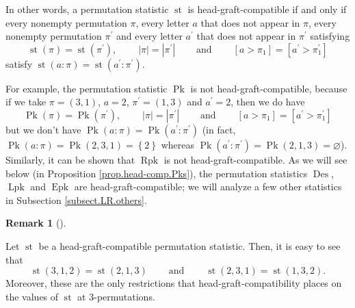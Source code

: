 \documentclass[numbers=enddot,12pt,final,onecolumn,notitlepage]{scrartcl}%
\theoremstyle{definition}
\newtheorem{remk}[theo]{Remark}
\newenvironment{remark}[1][]
{\begin{remk}[#1]\begin{leftbar}}
{\end{leftbar}\end{remk}}
\begin{document}
In other words, a permutation statistic $\operatorname*{st}$ is
head-graft-compatible if and only if every nonempty permutation $\pi$, every
letter $a$ that does not appear in $\pi$, every nonempty permutation
$\pi^{\prime}$ and every letter $a^{\prime}$ that does not appear in
$\pi^{\prime}$ satisfying%
\[
\operatorname*{st}\left(  \pi\right)  =\operatorname*{st}\left(  \pi^{\prime
}\right)  ,\ \ \ \ \ \ \ \ \ \ \left\vert \pi\right\vert =\left\vert
\pi^{\prime}\right\vert \ \ \ \ \ \ \ \ \ \ \text{and}%
\ \ \ \ \ \ \ \ \ \ \left[  a>\pi_{1}\right]  =\left[  a^{\prime}>\pi
_{1}^{\prime}\right]
\]
satisfy $\operatorname*{st}\left(  a:\pi\right)  =\operatorname*{st}\left(
a^{\prime}:\pi^{\prime}\right)  $.

For example, the permutation statistic $\operatorname*{Pk}$ is not
head-graft-compatible, because if we take $\pi=\left(  3,1\right)  $, $a=2$,
$\pi^{\prime}=\left(  1,3\right)  $ and $a^{\prime}=2$, then we do have%
\[
\operatorname*{Pk}\left(  \pi\right)  =\operatorname*{Pk}\left(  \pi^{\prime
}\right)  ,\ \ \ \ \ \ \ \ \ \ \left\vert \pi\right\vert =\left\vert
\pi^{\prime}\right\vert \ \ \ \ \ \ \ \ \ \ \text{and}%
\ \ \ \ \ \ \ \ \ \ \left[  a>\pi_{1}\right]  =\left[  a^{\prime}>\pi
_{1}^{\prime}\right]
\]
but we don't have $\operatorname*{Pk}\left(  a:\pi\right)  =\operatorname*{Pk}%
\left(  a^{\prime}:\pi^{\prime}\right)  $ (in fact, $\operatorname*{Pk}\left(
a:\pi\right)  =\operatorname*{Pk}\left(  2,3,1\right)  =\left\{  2\right\}  $
whereas $\operatorname*{Pk}\left(  a^{\prime}:\pi^{\prime}\right)
=\operatorname*{Pk}\left(  2,1,3\right)  =\varnothing$). Similarly, it can be
shown that $\operatorname*{Rpk}$ is not head-graft-compatible. As we will see
below (in Proposition \ref{prop.head-comp.Pks}), the permutation statistics
$\operatorname*{Des}$, $\operatorname*{Lpk}$ and $\operatorname*{Epk}$ are
head-graft-compatible; we will analyze a few other statistics in Subsection
\ref{subsect.LR.others}.

\begin{remark}
Let $\operatorname*{st}$ be a head-graft-compatible permutation statistic.
Then, it is easy to see that%
\[
\operatorname*{st}\left(  3,1,2\right)  =\operatorname*{st}\left(
2,1,3\right)  \ \ \ \ \ \ \ \ \ \ \text{and}%
\ \ \ \ \ \ \ \ \ \ \operatorname*{st}\left(  2,3,1\right)
=\operatorname*{st}\left(  1,3,2\right)  .
\]
Moreover, these are the only restrictions that head-graft-compatibility places
on the values of $\operatorname*{st}$ at $3$-permutations.
\end{remark}
\end{document}
